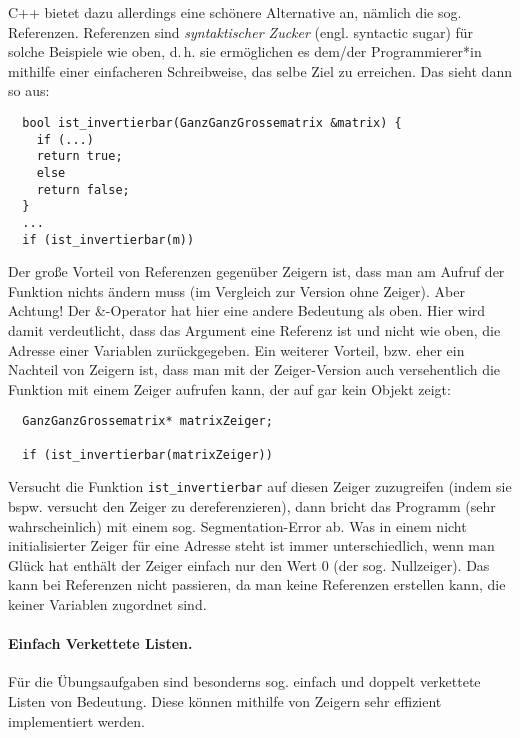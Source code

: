 \documentclass[
fontsize = 11pt,
paper    = a4,
BCOR     = 5mm,
DIV      = 12,
numbers  = noenddot,
]{scrartcl}
\begin{document}
C++ bietet dazu allerdings eine schönere Alternative an, nämlich die
sog. Referenzen. Referenzen sind \emph{syntaktischer Zucker}
(engl. syntactic sugar) für solche Beispiele wie oben, d.\,h.  sie
ermöglichen es dem/der Programmierer*in mithilfe einer einfacheren
Schreibweise, das selbe Ziel zu erreichen. Das sieht dann so aus:
\begin{lstlisting}
  bool ist_invertierbar(GanzGanzGrossematrix &matrix) {
    if (...)
    return true;
    else
    return false; 
  }
  ...
  if (ist_invertierbar(m))
\end{lstlisting}
Der große Vorteil von Referenzen gegenüber Zeigern ist, dass man am
Aufruf der Funktion nichts ändern muss (im Vergleich zur Version ohne
Zeiger). Aber Achtung! Der \&-Operator hat hier eine andere Bedeutung
als oben. Hier wird damit verdeutlicht, dass das Argument eine
Referenz ist und nicht wie oben, die Adresse einer Variablen
zurückgegeben. Ein weiterer Vorteil, bzw. eher ein Nachteil von
Zeigern ist, dass man mit der Zeiger-Version auch versehentlich die
Funktion mit einem Zeiger aufrufen kann, der auf gar kein Objekt
zeigt:
\begin{lstlisting}
  GanzGanzGrossematrix* matrixZeiger;

  if (ist_invertierbar(matrixZeiger))
\end{lstlisting}
Versucht die Funktion \lstinline{ist_invertierbar} auf diesen Zeiger
zuzugreifen (indem sie bspw. versucht den Zeiger zu dereferenzieren),
dann bricht das Programm (sehr wahrscheinlich) mit einem
sog. Segmentation-Error ab. Was in einem nicht initialisierter Zeiger
für eine Adresse steht ist immer unterschiedlich, wenn man Glück hat
enthält der Zeiger einfach nur den Wert 0 (der sog. Nullzeiger). Das
kann bei Referenzen nicht passieren, da man keine Referenzen erstellen
kann, die keiner Variablen zugordnet sind.

\paragraph{Einfach Verkettete Listen.} Für die Übungsaufgaben sind
besonderns sog. einfach und doppelt verkettete Listen von
Bedeutung. Diese können mithilfe von Zeigern sehr effizient
implementiert werden.
\end{document}
